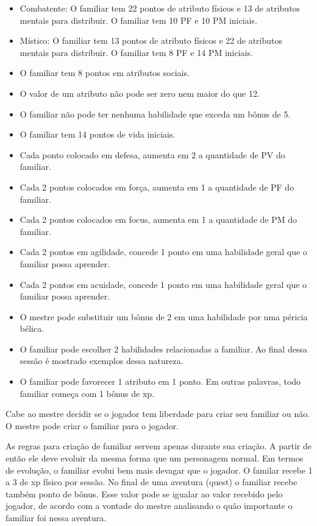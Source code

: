 \begin{itemize}
	\item Combatente: O familiar tem 22 pontos de atributo físicos e 13 de atributos mentais para distribuir. O familiar tem 10 PF e 10 PM iniciais.
	\item Místico: O familiar tem 13 pontos de atributo físicos e 22 de atributos mentais para distribuir. O familiar tem 8 PF e 14 PM iniciais.
	\item O familiar tem 8 pontos em atributos sociais.
	\item O valor de um atributo não pode ser zero nem maior do que 12.
	\item O familiar não pode ter nenhuma habilidade que exceda um bônus de 5.
	\item O familiar tem 14 pontos de vida iniciais.
	\item Cada ponto colocado em defesa, aumenta em 2 a quantidade de PV do familiar.
	\item Cada 2 pontos colocados em força, aumenta em 1 a quantidade de PF do familiar.
	\item Cada 2 pontos colocados em focus, aumenta em 1 a quantidade de PM do familiar.	
	\item Cada 2 pontos em agilidade, concede 1 ponto em uma habilidade geral que o familiar possa aprender.
	\item Cada 2 pontos em acuidade, concede 1 ponto em uma habilidade geral que o familiar possa aprender.		
	\item O mestre pode substituir um bônus de 2 em uma habilidade por uma péricia bélica.
	\item O familiar pode escolher 2 habilidades relacionadas a familiar. Ao final dessa sessão é mostrado exemplos dessa natureza.
	\item O familiar pode favorecer 1 atributo em 1 ponto. Em outras palavras, todo familiar começa com 1 bônus de xp.
\end{itemize}

Cabe ao mestre decidir se o jogador tem liberdade para criar seu familiar ou não. O mestre pode criar o familiar para o jogador.

As regras para criação de familiar servem apenas durante sua criação. A partir de então ele deve evoluir da mesma forma que um personagem normal. Em termos de evolução, o familiar evolui bem mais devagar que o jogador. O familar recebe 1 a 3 de xp físico por sessão. No final de uma aventura (quest) o familiar recebe também ponto de bônus. Esse valor pode se igualar ao valor recebido pelo jogador, de acordo com a vontade do mestre analisando o quão importante o familiar foi nessa aventura. 

